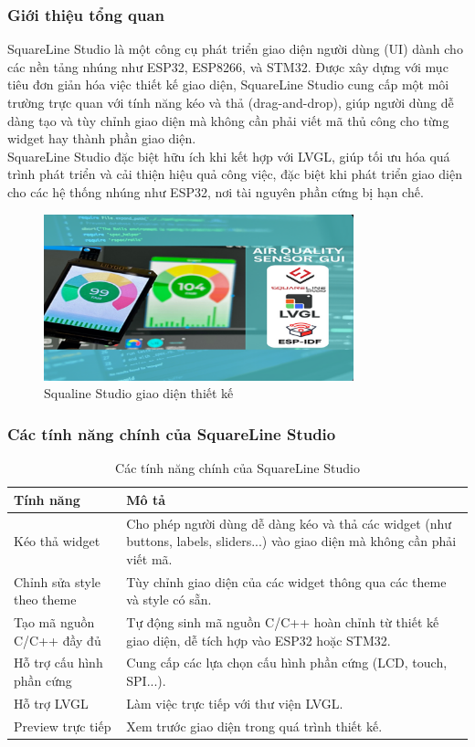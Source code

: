 \subsubsection{Giới thiệu tổng quan}
SquareLine Studio là một công cụ phát triển giao diện người dùng (UI) dành cho các nền tảng nhúng như ESP32, ESP8266, và STM32. Được xây dựng với mục tiêu đơn giản hóa việc thiết kế giao diện, SquareLine Studio cung cấp một môi trường trực quan với tính năng kéo và thả (drag-and-drop), giúp người dùng dễ dàng tạo và tùy chỉnh giao diện mà không cần phải viết mã thủ công cho từng widget hay thành phần giao diện.\\

SquareLine Studio đặc biệt hữu ích khi kết hợp với LVGL, giúp tối ưu hóa quá trình phát triển và cải thiện hiệu quả công việc, đặc biệt khi phát triển giao diện cho các hệ thống nhúng như ESP32, nơi tài nguyên phần cứng bị hạn chế.
\begin{figure}[H]
  \centering
  \includegraphics[width=0.8\textwidth]{Images/Squaline Studio.png}
  \caption{Squaline Studio giao diện thiết kế}
\end{figure}
\subsubsection{Các tính năng chính của SquareLine Studio}
\begin{table}[H]
\centering
\begin{tabular}{|p{4cm}|p{10cm}|}
\hline
\textbf{Tính năng} & \textbf{Mô tả} \\
\hline
Kéo thả widget & Cho phép người dùng dễ dàng kéo và thả các widget (như buttons, labels, sliders...) vào giao diện mà không cần phải viết mã. \\
\hline
Chỉnh sửa style theo theme & Tùy chỉnh giao diện của các widget thông qua các theme và style có sẵn. \\
\hline
Tạo mã nguồn C/C++ đầy đủ & Tự động sinh mã nguồn C/C++ hoàn chỉnh từ thiết kế giao diện, dễ tích hợp vào ESP32 hoặc STM32. \\
\hline
Hỗ trợ cấu hình phần cứng & Cung cấp các lựa chọn cấu hình phần cứng (LCD, touch, SPI...). \\
\hline
Hỗ trợ LVGL & Làm việc trực tiếp với thư viện LVGL. \\
\hline
Preview trực tiếp & Xem trước giao diện trong quá trình thiết kế. \\
\hline
\end{tabular}
\caption{Các tính năng chính của SquareLine Studio}
\end{table}

